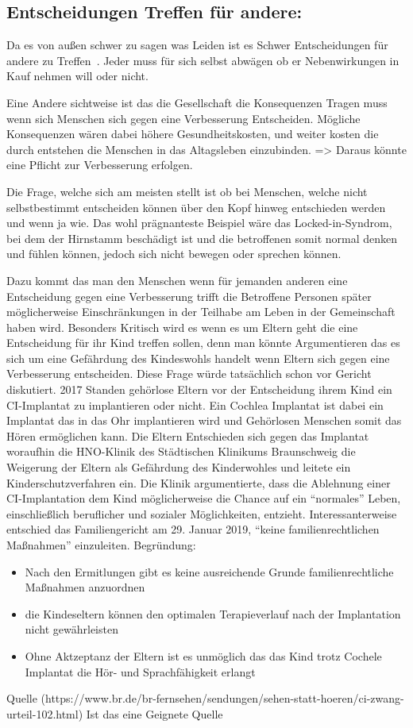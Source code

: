 \documentclass[a4paper,
DIV=13,
12pt,
BCOR=10mm,
department=FakEI,
twoside,
parskip=half,
automark,
]{OTHRartcl}
\begin{document}
\subsection*{Entscheidungen Treffen für andere:}
Da es von außen schwer zu sagen was Leiden ist es Schwer Entscheidungen für andere zu Treffen~\cite{plavsienkova2021healthy}. Jeder muss für sich selbst abwägen ob er Nebenwirkungen 
in Kauf nehmen will oder nicht. 

Eine Andere sichtweise ist das die Gesellschaft die Konsequenzen Tragen muss wenn sich Menschen sich gegen eine Verbesserung Entscheiden. Mögliche Konsequenzen wären dabei höhere 
Gesundheitskosten, und weiter kosten die durch entstehen die Menschen in das Altagsleben einzubinden. => Daraus könnte eine Pflicht zur Verbesserung erfolgen.

Die Frage, welche sich am meisten stellt ist ob bei Menschen, welche nicht selbstbestimmt entscheiden können über den Kopf hinweg entschieden werden  und wenn ja wie. Das wohl 
prägnanteste Beispiel wäre das Locked-in-Syndrom, bei dem der Hirnstamm beschädigt ist und die betroffenen somit normal denken und fühlen können, jedoch sich nicht bewegen oder 
sprechen können.~\cite{das2022locked}

Dazu kommt das man den Menschen wenn für jemanden anderen eine Entscheidung gegen eine Verbesserung trifft die Betroffene Personen später  möglicherweise Einschränkungen in der 
Teilhabe am Leben in der Gemeinschaft haben wird. Besonders Kritisch wird es wenn es um Eltern geht die eine Entscheidung für ihr Kind treffen sollen, denn man könnte Argumentieren 
das es sich um eine Gefährdung des Kindeswohls handelt wenn Eltern sich gegen eine Verbesserung entscheiden.
Diese Frage würde tatsächlich schon vor Gericht diskutiert. 2017 Standen gehörlose Eltern vor der Entscheidung ihrem Kind ein CI-Implantat zu implantieren oder nicht. Ein Cochlea 
Implantat ist dabei ein Implantat das in das Ohr implantieren wird und Gehörlosen Menschen somit das Hören ermöglichen kann. Die Eltern Entschieden sich gegen das Implantat
woraufhin die HNO-Klinik des Städtischen Klinikums Braunschweig  die Weigerung der Eltern als Gefährdung des Kinderwohles und leitete ein Kinderschutzverfahren ein. 
Die Klinik argumentierte, dass die Ablehnung einer CI-Implantation dem Kind möglicherweise die Chance auf ein ``normales'' Leben, einschließlich beruflicher und 
sozialer Möglichkeiten, entzieht. Interessanterweise entschied das Familiengericht am 29. Januar 2019, ``keine familienrechtlichen Maßnahmen'' einzuleiten. 
Begründung:
\begin{itemize}
    \item Nach den Ermitlungen gibt es keine ausreichende Grunde familienrechtliche Maßnahmen anzuordnen
    \item die Kindeseltern können den optimalen Terapieverlauf nach der Implantation nicht gewährleisten
    \item Ohne Aktzeptanz der Eltern ist es unmöglich das das Kind trotz Cochele Implantat die Hör- und Sprachfähigkeit erlangt
\end{itemize}
Quelle (https://www.br.de/br-fernsehen/sendungen/sehen-statt-hoeren/ci-zwang-urteil-102.html) Ist das eine Geignete Quelle
\end{document}
